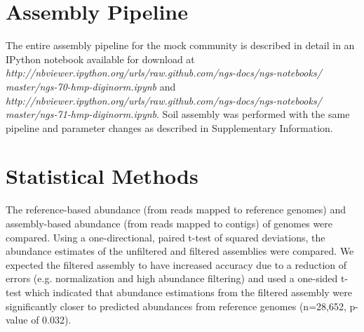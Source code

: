 \documentclass{nature}%
\begin{document}
\section*{Assembly Pipeline}

The entire assembly pipeline for the mock community is described in
detail in an IPython notebook available for download at 
\emph{http://nbviewer.ipython.org/urls/raw.github.com/ngs-docs/ngs-notebooks/
master/ngs-70-hmp-diginorm.ipynb}
and 
\emph{http://nbviewer.ipython.org/urls/raw.github.com/ngs-docs/ngs-notebooks/
master/ngs-71-hmp-diginorm.ipynb}.  Soil assembly was performed with
the same pipeline and parameter changes as described in Supplementary Information.

\section*{Statistical Methods}
The reference-based abundance (from reads mapped to reference genomes)
and assembly-based abundance (from reads mapped to contigs) of genomes
were compared.  Using a one-directional, paired t-test of squared
deviations, the abundance estimates of the unfiltered and filtered
assemblies were compared.  We expected the filtered assembly to have
increased accuracy due to a reduction of errors (e.g. normalization
and high abundance filtering) and used a one-sided t-test which
indicated that abundance estimations from the filtered assembly were
significantly closer to predicted abundances from reference genomes
(n=28,652, p-value of 0.032).

\newpage


\end{document}
